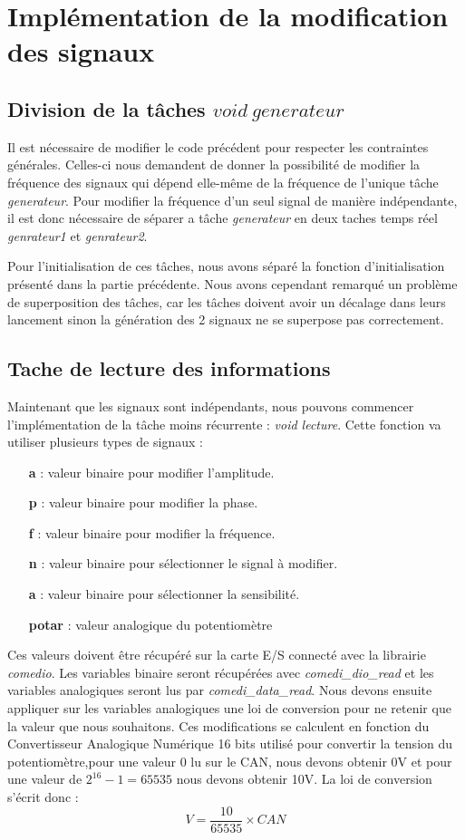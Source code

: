 \section{Implémentation de la modification des signaux}

\subsection{Division de la tâches $void\ generateur$}	
Il est nécessaire de modifier le code précédent pour respecter les contraintes générales. Celles-ci nous demandent de donner la possibilité de modifier la fréquence des signaux qui dépend elle-même de la fréquence de l'unique tâche \emph{generateur}. Pour modifier la fréquence d'un seul signal de manière indépendante, il est donc nécessaire de séparer a tâche \emph{generateur} en deux taches temps réel \emph{genrateur1} et \emph{genrateur2}. 

Pour l'initialisation de ces tâches, nous avons séparé la fonction d'initialisation présenté dans la partie précédente. Nous avons cependant remarqué un problème de superposition des tâches, car les tâches doivent avoir un décalage dans leurs lancement sinon la génération des 2 signaux ne se superpose pas correctement. 
\subsection{Tache de lecture des informations}
Maintenant que les signaux sont indépendants, nous pouvons commencer l'implémentation de la tâche moins récurrente : \emph{void lecture}. Cette fonction va utiliser plusieurs types de signaux : 
\begin{itemize}
\item[\textbf{a} :]valeur binaire pour modifier l'amplitude.
\item[\textbf{p} :]valeur binaire pour modifier la phase.
\item[\textbf{f} :]valeur binaire pour modifier la fréquence.
\item[\textbf{n} :]valeur binaire pour sélectionner le signal à modifier.
\item[\textbf{a} :]valeur binaire pour sélectionner la sensibilité.
\item[\textbf{potar} :]valeur analogique du potentiomètre
\end{itemize}
Ces valeurs doivent être récupéré sur la carte E/S connecté avec la librairie \emph{comedio}. Les variables binaire seront récupérées avec \emph{comedi\_dio\_read} et les variables analogiques seront lus par \emph{comedi\_data\_read}. Nous devons ensuite appliquer sur les variables analogiques une loi de conversion pour ne retenir que la valeur que nous souhaitons. Ces modifications se calculent en fonction du Convertisseur Analogique Numérique 16 bits utilisé pour convertir la tension du potentiomètre,pour une valeur 0 lu sur le CAN, nous devons obtenir 0V et pour une valeur de $2^{16}-1= 65535$ nous devons obtenir 10V. La loi de conversion s'écrit donc : \begin{equation}
V = \frac{10}{65535}\times CAN
\end{equation} 
